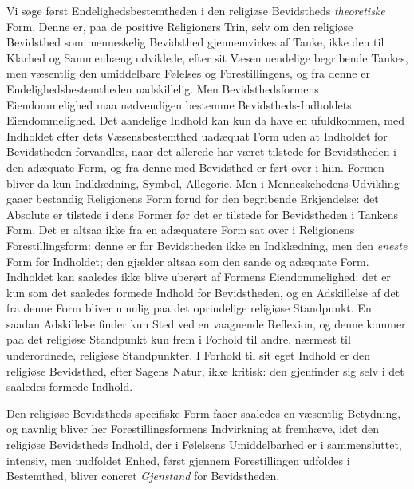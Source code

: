 \documentclass[12pt,a4paper]{book}
\newcommand{\opage}[1]{\marginnote{\footnotesize\textit{[#1]}}}
\begin{document}
Vi søge først Endelighedsbestemtheden i den religiøse Bevidstheds
\emph{theoretiske} Form. Denne er, paa de positive Religioners Trin, selv om den
religiøse Bevidsthed som menneskelig Bevidsthed gjennemvirkes af Tanke, ikke den
til Klarhed og Sammenhæng udviklede, efter sit Væsen uendelige begribende Tankes,
men væsentlig den umiddelbare \opage{34}Følelses og Forestillingens, og fra denne er
Endelighedsbestemtheden uadskillelig. Men Bevidsthedsformens Eiendommelighed maa
nødvendigen bestemme Bevidstheds-Indholdets Eiendommelighed. Det aandelige
Indhold kan kun da have en ufuldkommen, med Indholdet efter dets Væsensbestemthed
uadæquat Form uden at Indholdet for Bevidstheden forvandles, naar det allerede
har været tilstede for Bevidstheden i den adæquate Form, og fra denne med
Bevidsthed er ført over i hiin. Formen bliver da kun Indklædning, Symbol,
Allegorie. Men i Menneskehedens Udvikling gaaer bestandig Religionens Form forud
for den begribende Erkjendelse: det Absolute er tilstede i dens Former før det er
tilstede for Bevidstheden i Tankens Form. Det er altsaa ikke fra en adæquatere
Form sat over i Religionens Forestillingsform: denne er for Bevidstheden ikke en
Indklædning, men den \emph{eneste} Form for Indholdet; den gjælder altsaa som den
sande og adæquate Form. Indholdet kan saaledes ikke blive uberørt af Formens
Eiendommelighed: det er kun som det saaledes formede Indhold for Bevidstheden, og en Adskillelse af det fra denne Form bliver umulig paa det oprindelige religiøse
Standpunkt. En saadan Adskillelse finder kun Sted ved en vaagnende Reflexion, og
denne kommer paa det religiøse Standpunkt kun frem i Forhold til andre, nærmest
til underordnede, religiøse Standpunkter. I Forhold til sit eget Indhold er den
religiøse Bevidsthed, efter Sagens Natur, ikke kritisk: den gjenfinder sig selv i
det saaledes formede Indhold.

Den religiøse Bevidstheds specifiske Form faaer saaledes en væsentlig Betydning,
og navnlig bliver her Forestillingsformens Indvirkning at fremhæve, idet den
religiøse Bevidstheds Indhold, der i Følelsens Umiddelbarhed er i sammensluttet,
intensiv, men uudfoldet Enhed, først gjennem Forestillingen udfoldes i
Bestemthed, bliver concret \emph{Gjenstand} for Bevidstheden.
\end{document}
